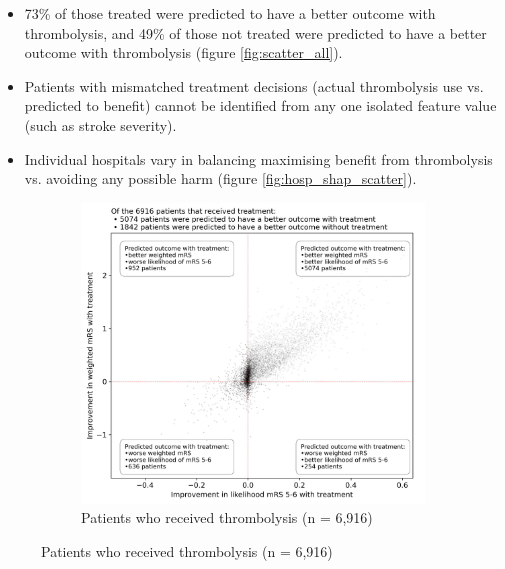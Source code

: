 \begin{enumerate}
\begin{itemize}
    \item 73\% of those treated were predicted to have a better outcome with thrombolysis, and 49\% of those not treated were predicted to have a better outcome with thrombolysis (figure \ref{fig:scatter_all}).
    
    \item Patients with mismatched treatment decisions (actual thrombolysis use vs. predicted to benefit) cannot be identified from any one isolated feature value (such as stroke severity).
    
    \item Individual hospitals vary in balancing maximising benefit from thrombolysis vs. avoiding any possible harm (figure \ref{fig:hosp_shap_scatter}).
\end{itemize}

\begin{figure}
\centering
    \begin{subfigure}{.7\textwidth}
      \centering
      \captionsetup{width=.9\linewidth}
      \includegraphics[trim={0 0 0 1.7cm}, clip, width=1\linewidth]{./images/p4_scatter_treated}
      \caption{\footnotesize{Patients who received thrombolysis (n = 6,916)}}
      \label{fig:scatter_receive}
    \end{subfigure}
    
    \vspace{5mm}
    

\end{figure}
\end{enumerate}
